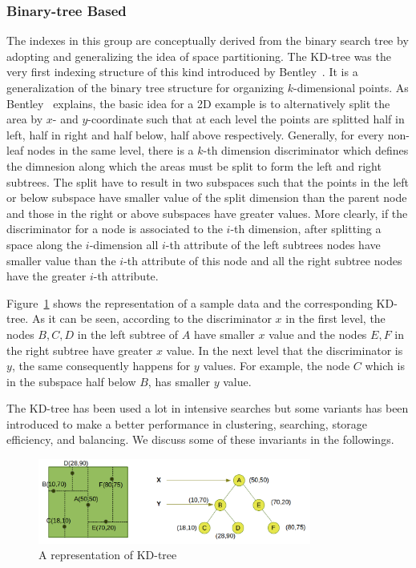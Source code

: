 \documentclass[a4paper,12pt]{article}
\begin{document}
\subsubsection{Binary-tree Based}
\label{binary-tree-based}
The indexes in this group are conceptually derived from the binary search tree by adopting and generalizing the idea of space partitioning. 
The KD-tree was the very first indexing structure of this kind introduced by Bentley~\cite{bently1975}. 
It is a generalization of the binary tree structure for organizing $k$-dimensional points. As Bentley~\cite{bently1975} explains, the basic idea for a 2D example is to alternatively split the area by $x$- and $y$-coordinate such that at each level the points are splitted half in left, half in right and half below, half above respectively. Generally, for every non-leaf nodes in the same level, there is a $k$-th dimension discriminator which defines the dimnesion along which the areas must be split to form the left and right subtrees. The split have to result in two subspaces such that the points in the left or below subspace have smaller value of the split dimension than the parent node and those in the right or above subspaces have greater values. More clearly, if the discriminator for a node is associated to the $i$-th dimension, after splitting a space along the $i$-dimension all $i$-th attribute of the left subtrees nodes have smaller value than the $i$-th attribute of this node and all the right subtree nodes have the greater $i$-th attribute. 

Figure~\ref{figkdtree} shows the representation of a sample data and the corresponding KD-tree. As it can be seen, according to the discriminator $x$ in the first level, the nodes $B, C, D$ in the left subtree of $A$ have smaller $x$ value and the nodes $E, F$ in the right subtree have greater $x$ value. In the next level that the discriminator is $y$, the same consequently happens for $y$ values. For example, the node $C$ which is in the subspace half below $B$, has smaller $y$ value.

The KD-tree has been used a lot in intensive searches but some variants has been introduced to make a better performance in clustering, searching, storage efficiency,  
and balancing. We discuss some of these invariants in the followings.

\begin{figure}
\centering
\includegraphics[width=0.8\textwidth]{kd-Tree}
\caption{A representation of KD-tree}
\label{figkdtree}
\end{figure}
\end{document}

